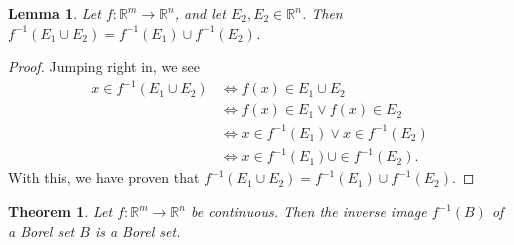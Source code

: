 \documentclass[10pt,a4paper]{article}
\theoremstyle{theorem}
\newtheorem{theorem}{Theorem}
\newtheorem{lemma}{Lemma}
\theoremstyle{definition}
\begin{document}
\begin{lemma}
Let $f: \mathbb{R}^m \to \mathbb{R}^n$, and let $E_2, E_2 \in \mathbb{R}^n$. Then $f^{-1}(E_1 \cup E_2) = f^{-1}(E_1) \cup f^{-1}(E_2)$.
\end{lemma}

\begin{proof}
Jumping right in, we see
\begin{align*}
x \in f^{-1}(E_1 \cup E_2) &\iff f(x) \in E_1 \cup E_2\\
&\iff f(x) \in E_1 \lor f(x) \in E_2\\
&\iff x \in f^{-1}(E_1) \lor x \in f^{-1}(E_2)\\
&\iff x \in f^{-1}(E_1) \cup \in f^{-1}(E_2).
\end{align*}
With this, we have proven that $f^{-1}(E_1 \cup E_2) = f^{-1}(E_1) \cup f^{-1}(E_2)$.
\end{proof}

\begin{theorem}
Let $f: \mathbb{R}^m \to \mathbb{R}^n$ be continuous. Then the inverse image $f^{-1}(B)$ of a Borel set $B$ is a Borel set.
\end{theorem}
\end{document}
